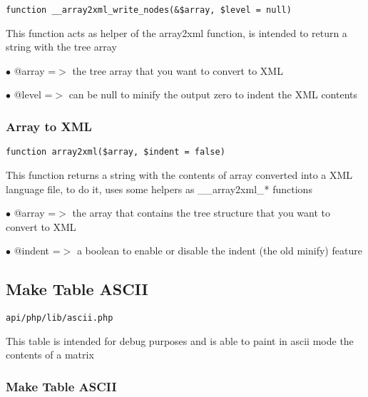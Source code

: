 \documentclass[a4paper]{article}
\begin{document}
\begin{lstlisting}
function __array2xml_write_nodes(&$array, $level = null)
\end{lstlisting}

This function acts as helper of the array2xml function, is intended to
return a string with the tree array

\begin{compactitem}
\item[\color{myblue}$\bullet$] @array =$>$ the tree array that you want to convert to XML
\item[\color{myblue}$\bullet$] @level =$>$ can be null to minify the output zero to indent the XML contents
\end{compactitem}

\hypertarget{toc371}{}
\subsubsection{Array to XML}

\begin{lstlisting}
function array2xml($array, $indent = false)
\end{lstlisting}

This function returns a string with the contents of array converted into a XML
language file, to do it, uses some helpers as \_\_array2xml\_* functions

\begin{compactitem}
\item[\color{myblue}$\bullet$] @array  =$>$ the array that contains the tree structure that you want to convert to XML
\item[\color{myblue}$\bullet$] @indent =$>$ a boolean to enable or disable the indent (the old minify) feature
\end{compactitem}

\hypertarget{toc372}{}
\subsection{Make Table ASCII}

\begin{lstlisting}
api/php/lib/ascii.php
\end{lstlisting}

This table is intended for debug purposes and is able to paint in ascii
mode the contents of a matrix

\hypertarget{toc373}{}
\subsubsection{Make Table ASCII}
\end{document}

